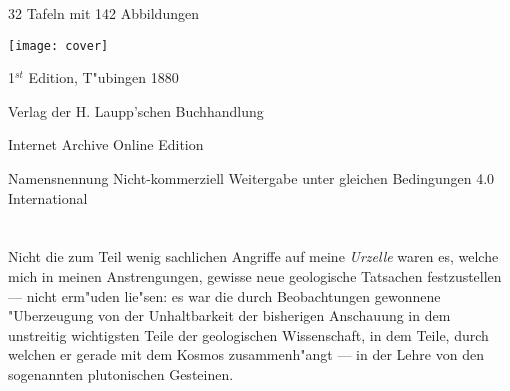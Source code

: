 \documentclass[a4paper, 11pt, oneside]{article}
\begin{document}
\begin{titlepage}
	\vspace*{1\baselineskip} %
	
    {\small 32 Tafeln mit 142 Abbildungen} %
    
	
	\vspace{1\baselineskip} %
	
	
	\texttt{[image: cover]}
	
		
	\vspace*{\fill}%
	
	1$^{st}$ Edition, T"ubingen 1880 %
	
	{\small Verlag der H. Laupp'schen Buchhandlung } %

	\vspace{1\baselineskip} %

    Internet Archive Online Edition  %
	
	{\small Namensnennung Nicht-kommerziell Weitergabe unter gleichen Bedingungen 4.0 International } %
\end{titlepage}
\setlength{\parskip}{1mm plus1mm minus1mm}
\setcounter{tocdepth}{2}
\setcounter{secnumdepth}{3}
\pagestyle{fancy}
\fancyhf{}
\cfoot{\frakfamily{\thepage}}
\tableofcontents
\clearpage
\listoffigures
\clearpage
\LARGE
\section{}
\subsection{}
\paragraph{}
Nicht die zum Teil wenig sachlichen Angriffe auf meine \emph{Urzelle} waren es, welche mich in meinen Anstrengungen, gewisse neue geologische Tatsachen festzustellen --- nicht erm"uden lie"sen: es war die durch Beobachtungen gewonnene "Uberzeugung von der Unhaltbarkeit der bisherigen Anschauung in dem unstreitig wichtigsten Teile der geologischen Wissenschaft, in dem Teile, durch welchen er gerade mit dem Kosmos zusammenh"angt --- in der Lehre von den sogenannten plutonischen Gesteinen.
\end{document}
